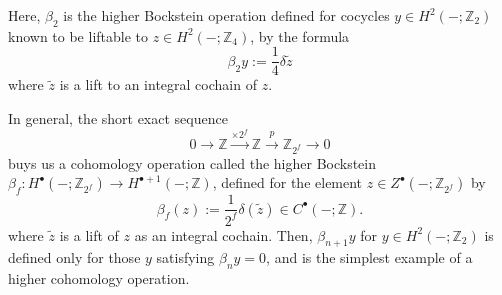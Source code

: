 \documentclass[12pt]{article}
\numberwithin{equation}{section}
\let\tilde\widetilde
\def\bZ{\mathbb{Z}}
\begin{document}
Here, $\beta_2$ is the higher Bockstein operation
defined for cocycles $y\in H^2(-;\bZ_2)$ known to be liftable to $z\in H^2(-;\bZ_4)$,
by the formula \begin{equation}
\beta_2 y := \frac14 \delta \tilde z
\end{equation} where $\tilde z$ is a lift to an integral cochain of $z$.

In general,
the short exact sequence
\begin{equation*}
	0
	\to
	\bZ
	\overset{\times 2^{f}}{\longrightarrow}
	\bZ
	\overset{p}{\longrightarrow}
	\bZ_{2^f}
	\to
	0
\end{equation*}
buys us a cohomology operation called the higher Bockstein $\beta_f: H^{\bullet}(-;\bZ_{2^f}) \to H^{\bullet+1}(-;\bZ)$, defined for the element $z \in Z^{\bullet}(-;\bZ_{2^f})$ 
by 
\begin{equation*}
	\beta_f (z) := \frac{1}{2^f}
	\delta (\tilde z)
	\in C^\bullet(-;\bZ).
\end{equation*}
where $\tilde z$ is a lift of $z$ as an integral cochain.
Then, $\beta_{n+1} y$  for $y \in H^2(-;\bZ_2)$ is defined only for those $y$ satisfying $\beta_{n}y=0$,
and is the simplest example of a higher cohomology operation.
\end{document}
